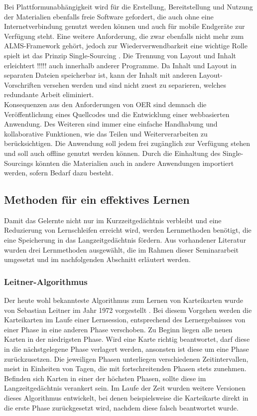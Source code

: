Bei Plattformunabhängigkeit wird für die Erstellung, Bereitstellung und Nutzung der Materialien ebenfalls freie Software gefordert, die auch ohne eine Internetverbindung genutzt werden können und auch für mobile Endgeräte zur Verfügung steht. Eine weitere Anforderung, die zwar ebenfalls nicht mehr zum ALMS-Framework gehört, jedoch zur Wiederverwendbarkeit eine wichtige Rolle spielt ist das Prinzip \glqq Single-Sourcing \grqq{}. Die Trennung von Layout und Inhalt erleichtert !!!!! auch innerhalb anderer Programme. Da Inhalt und Layout in separaten Dateien speicherbar ist, kann der Inhalt mit anderen Layout-Vorschriften versehen werden und sind nicht zuest zu separieren, welches redundante Arbeit eliminiert.  \\

Konsequenzen aus den Anforderungen von OER sind demnach die Veröffentlichung eines Quellcodes und die Entwicklung einer webbasierten Anwendung. Des Weiteren sind immer eine einfache Handhabung und kollaborative Funktionen, wie das Teilen und Weiterverarbeiten zu berücksichtigen. Die Anwendung soll jedem frei zugänglich zur Verfügung stehen und soll auch offline genutzt werden können. Durch die Einhaltung des Single-Sourcings könnten die Materialien auch in andere Anwendungen importiert werden, sofern Bedarf dazu besteht.


\subsection{Methoden für ein effektives Lernen}
Damit das Gelernte nicht nur im Kurzzeitgedächtnis verbleibt und eine Reduzierung von Lernschleifen erreicht wird, werden Lernmethoden benötigt, die eine Speicherung in das Langzeitgedächtnis fördern. Aus vorhandener Literatur wurden drei Lernmethoden ausgewählt, die im Rahmen dieser Seminararbeit umgesetzt und im nachfolgenden Abschnitt erläutert werden.

\subsubsection{Leitner-Algorithmus}
Der heute wohl bekannteste Algorithmus zum Lernen von Karteikarten wurde von Sebastian Leitner im Jahr 1972 vorgestellt \cite{SebastianLeitner.1972}. Bei diesem Vorgehen werden die Karteikarten im Laufe einer Lernsession, entsprechend des Lernergebnisses von einer Phase in eine anderen Phase verschoben. Zu Beginn liegen alle neuen Karten in der niedrigsten Phase. Wird eine Karte richtig beantwortet, darf diese in die nächstgelegene Phase verlagert werden, ansonsten ist diese um eine Phase zurückzusetzen. Die jeweiligen Phasen unterliegen verschiedenen Zeitintervallen, meist in Einheiten von Tagen, die mit fortschreitenden Phasen stets zunehmen. Befinden sich Karten in einer der höchsten Phasen, sollte diese im Langzeitgedächtnis verankert sein. Im  Laufe der Zeit wurden weitere Versionen dieses Algorithmus entwickelt, bei denen beispielsweise die Karteikarte direkt in die erste Phase zurückgesetzt wird, nachdem diese falsch beantwortet wurde.

